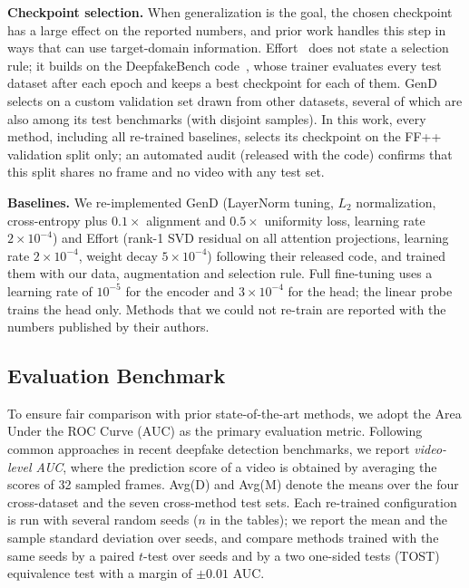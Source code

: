 \documentclass[fonts]{icst}
\newif\ifrevmark\revmarkfalse
\newcommand{\rev}[1]{\ifrevmark{\color{revblue}#1}\else#1\fi}
\newenvironment{revblock}{\ifrevmark\color{revblue}\fi}{}
\begin{document}
\begin{revblock}
\noindent\textbf{Checkpoint selection.}\label{sec:selection}
When generalization is the goal, the chosen checkpoint has a large effect on the reported numbers, and prior work handles this step in ways that can use target-domain information. Effort~\cite{yan2025effort} does not state a selection rule; it builds on the DeepfakeBench code~\cite{yan2023deepfakebench}, whose trainer evaluates every test dataset after each epoch and keeps a best checkpoint for each of them. GenD~\cite{yermakov2025gend} selects on a custom validation set drawn from other datasets, several of which are also among its test benchmarks (with disjoint samples). In this work, every method, including all re-trained baselines, selects its checkpoint on the FF++ validation split only; an automated audit (released with the code) confirms that this split shares no frame and no video with any test set.

\noindent\textbf{Baselines.}
We re-implemented GenD (LayerNorm tuning, $L_2$ normalization, cross-entropy plus $0.1\times$ alignment and $0.5\times$ uniformity loss, learning rate $2\times10^{-4}$) and Effort (rank-1 SVD residual on all attention projections, learning rate $2\times10^{-4}$, weight decay $5\times10^{-4}$) following their released code, and trained them with our data, augmentation and selection rule. Full fine-tuning uses a learning rate of $10^{-5}$ for the encoder and $3\times10^{-4}$ for the head; the linear probe trains the head only. Methods that we could not re-train are reported with the numbers published by their authors.
\end{revblock}

\subsection{Evaluation Benchmark}

To ensure fair comparison with prior state-of-the-art methods, we adopt the Area Under the ROC Curve (AUC) as the primary evaluation metric.
Following common \rev{approaches} in recent deepfake detection benchmarks, we report \textit{video-level AUC}, where the prediction score of a video is obtained by averaging the scores of 32 sampled frames.
\rev{Avg(D) and Avg(M) denote the means over the four cross-dataset and the seven cross-method test sets. Each re-trained configuration is run with several random seeds ($n$ in the tables); we report the mean and the sample standard deviation over seeds, and compare methods trained with the same seeds by a paired $t$-test over seeds and by a two one-sided tests (TOST) equivalence test with a margin of $\pm0.01$ AUC.}
\end{document}
